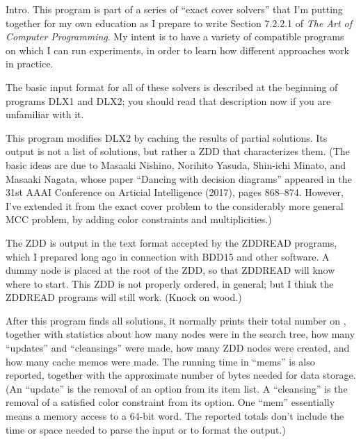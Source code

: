 
\let\Xmod=\bmod %

\datethis

Intro. This program is part of a series of ``exact cover solvers'' that
I'm putting together for my own education as I prepare to write Section
7.2.2.1 of {\sl The Art of Computer Programming}. My intent is to
have a variety of compatible programs on which I can run experiments,
in order to learn how different approaches work in practice.

The basic input format for all of these solvers is described at the beginning
of programs {\mc DLX1} and {\mc DLX2};
you should read that description now if you are unfamiliar with it.

This program modifies {\mc DLX2} by caching the results of partial solutions.
Its output is not a list of solutions, but rather a ZDD that characterizes
them. (The basic ideas are due to Masaaki Nishino, Norihito Yasuda,
Shin-ichi Minato, and Masaaki Nagata, whose paper ``Dancing with
decision diagrams'' appeared in the 31st AAAI Conference on Articial
Intelligence (2017), pages 868--874. However, I've extended it from
the exact cover problem to the considerably more general {\mc MCC} problem,
by adding color constraints and multiplicities.)

The ZDD is output in the text format accepted by the {\mc ZDDREAD} programs,
which I prepared long ago in connection with {\mc BDD15} and other software.
A dummy node is placed at the root of the ZDD, so that {\mc ZDDREAD} will
know where to start.
This ZDD is not properly ordered, in general; but I think the
{\mc ZDDREAD} programs will still work. (Knock on wood.)

\fi

After this program finds all solutions, it normally prints their total
number on , together with statistics about how many
nodes were in the search tree, how many ``updates'' and
``cleansings'' were made, how many ZDD nodes were created, and
how many cache memos were made.
The running time in ``mems'' is also reported, together with the approximate
number of bytes needed for data storage.
(An ``update'' is the removal of an option from its item list.
A ``cleansing'' is the removal of a satisfied color constraint from its option.
One ``mem'' essentially means a memory access to a 64-bit word.
The reported totals don't include the time or space needed to parse the
input or to format the output.)

